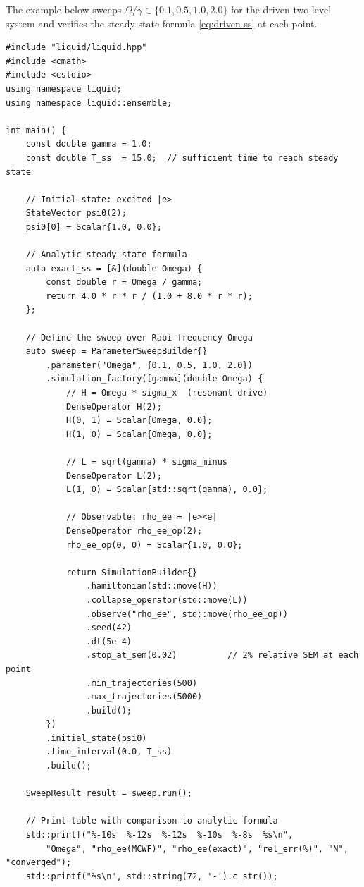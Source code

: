 \documentclass[11pt,a4paper,twoside]{book}
\theoremstyle{definition}
\theoremstyle{remark}
\begin{document}
The example below sweeps $\Omega/\gamma \in \{0.1, 0.5, 1.0, 2.0\}$
for the driven two-level system and verifies the steady-state formula
\cref{eq:driven-ss} at each point.

\begin{verbatim}
#include "liquid/liquid.hpp"
#include <cmath>
#include <cstdio>
using namespace liquid;
using namespace liquid::ensemble;

int main() {
    const double gamma = 1.0;
    const double T_ss  = 15.0;  // sufficient time to reach steady state

    // Initial state: excited |e>
    StateVector psi0(2);
    psi0[0] = Scalar{1.0, 0.0};

    // Analytic steady-state formula
    auto exact_ss = [&](double Omega) {
        const double r = Omega / gamma;
        return 4.0 * r * r / (1.0 + 8.0 * r * r);
    };

    // Define the sweep over Rabi frequency Omega
    auto sweep = ParameterSweepBuilder{}
        .parameter("Omega", {0.1, 0.5, 1.0, 2.0})
        .simulation_factory([gamma](double Omega) {
            // H = Omega * sigma_x  (resonant drive)
            DenseOperator H(2);
            H(0, 1) = Scalar{Omega, 0.0};
            H(1, 0) = Scalar{Omega, 0.0};

            // L = sqrt(gamma) * sigma_minus
            DenseOperator L(2);
            L(1, 0) = Scalar{std::sqrt(gamma), 0.0};

            // Observable: rho_ee = |e><e|
            DenseOperator rho_ee_op(2);
            rho_ee_op(0, 0) = Scalar{1.0, 0.0};

            return SimulationBuilder{}
                .hamiltonian(std::move(H))
                .collapse_operator(std::move(L))
                .observe("rho_ee", std::move(rho_ee_op))
                .seed(42)
                .dt(5e-4)
                .stop_at_sem(0.02)          // 2% relative SEM at each point
                .min_trajectories(500)
                .max_trajectories(5000)
                .build();
        })
        .initial_state(psi0)
        .time_interval(0.0, T_ss)
        .build();

    SweepResult result = sweep.run();

    // Print table with comparison to analytic formula
    std::printf("%-10s  %-12s  %-12s  %-10s  %-8s  %s\n",
        "Omega", "rho_ee(MCWF)", "rho_ee(exact)", "rel_err(%)", "N", "converged");
    std::printf("%s\n", std::string(72, '-').c_str());


\end{verbatim}
\end{document}
